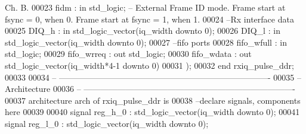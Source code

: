 \begin{DoxyCode}
{       Ch. B. }
00023       \textcolor{vhdlchar}{fidm}         \textcolor{vhdlchar}{:} \textcolor{keywordflow}{in} \textcolor{comment}{std\_logic};\textcolor{keyword}{ -- External Frame ID mode. Frame start at fsync = 0, when 0. Frame start
       at fsync = 1, when 1.}
00024 \textcolor{keyword}{      --Rx interface data }
00025       \textcolor{vhdlchar}{DIQ_h}         \textcolor{vhdlchar}{:} \textcolor{keywordflow}{in} \textcolor{comment}{std\_logic\_vector}\textcolor{vhdlchar}{(}\textcolor{vhdlchar}{iq_width} \textcolor{keywordflow}{downto} \textcolor{vhdllogic}{}\textcolor{vhdllogic}{0}\textcolor{vhdlchar}{)};
00026         \textcolor{vhdlchar}{DIQ_l}          \textcolor{vhdlchar}{:} \textcolor{keywordflow}{in} \textcolor{comment}{std\_logic\_vector}\textcolor{vhdlchar}{(}\textcolor{vhdlchar}{iq_width} \textcolor{keywordflow}{downto} \textcolor{vhdllogic}{}\textcolor{vhdllogic}{0}\textcolor{vhdlchar}{)};
00027 \textcolor{keyword}{      --fifo ports }
00028       \textcolor{vhdlchar}{fifo_wfull}  \textcolor{vhdlchar}{:} \textcolor{keywordflow}{in} \textcolor{comment}{std\_logic};
00029       \textcolor{vhdlchar}{fifo_wrreq}  \textcolor{vhdlchar}{:} \textcolor{keywordflow}{out} \textcolor{comment}{std\_logic};
00030       \textcolor{vhdlchar}{fifo_wdata}  \textcolor{vhdlchar}{:} \textcolor{keywordflow}{out} \textcolor{comment}{std\_logic\_vector}\textcolor{vhdlchar}{(}\textcolor{vhdlchar}{iq_width}\textcolor{vhdlchar}{*}\textcolor{vhdllogic}{4-1} \textcolor{keywordflow}{downto} \textcolor{vhdllogic}{}\textcolor{vhdllogic}{0}\textcolor{vhdlchar}{)}   
00031         \textcolor{vhdlchar}{)};
00032 \textcolor{keywordflow}{end} \textcolor{vhdlchar}{rxiq\_pulse\_ddr};
00033 
00034 \textcolor{keyword}{-- ----------------------------------------------------------------------------}
00035 \textcolor{keyword}{-- Architecture}
00036 \textcolor{keyword}{-- ----------------------------------------------------------------------------}
00037 \textcolor{keywordflow}{architecture} arch \textcolor{keywordflow}{of} rxiq_pulse_ddr is
00038 \textcolor{keyword}{--declare signals,  components here}
00039 
00040 \textcolor{keywordflow}{signal} \textcolor{vhdlchar}{reg_h_0}             \textcolor{vhdlchar}{:} \textcolor{comment}{std\_logic\_vector}\textcolor{vhdlchar}{(}\textcolor{vhdlchar}{iq_width} \textcolor{keywordflow}{downto} \textcolor{vhdllogic}{}\textcolor{vhdllogic}{0}\textcolor{vhdlchar}{)};
00041 \textcolor{keywordflow}{signal} \textcolor{vhdlchar}{reg_l_0}             \textcolor{vhdlchar}{:} \textcolor{comment}{std\_logic\_vector}\textcolor{vhdlchar}{(}\textcolor{vhdlchar}{iq_width} \textcolor{keywordflow}{downto} \textcolor{vhdllogic}{}\textcolor{vhdllogic}{0}\textcolor{vhdlchar}{)};

\end{DoxyCode}
